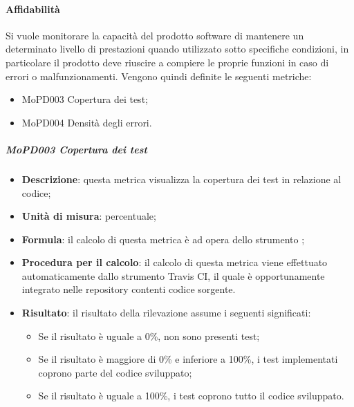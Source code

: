 \documentclass[../norme-di-progetto.tex]{subfiles}
\begin{document}
\paragraph{Affidabilità}
Si vuole monitorare la capacità del prodotto software di mantenere un determinato livello di prestazioni quando utilizzato sotto specifiche condizioni, in particolare il prodotto deve riuscire a compiere le proprie funzioni in caso di errori o malfunzionamenti. Vengono quindi definite le seguenti metriche:
\begin{itemize}
  \item MoPD003 Copertura dei test;
  \item MoPD004 Densità degli errori.
\end{itemize}
\subparagraph{MoPD003 Copertura dei test}
\begin{itemize}
  \item \textbf{Descrizione}: questa metrica visualizza la copertura dei test in relazione al codice;
  \item \textbf{Unità di misura}: percentuale;
  \item \textbf{Formula}: il calcolo di questa metrica è ad opera dello strumento ;
  \item \textbf{Procedura per il calcolo}: il calcolo di questa metrica viene effettuato automaticamente dallo strumento Travis CI, il quale è opportunamente integrato nelle repository contenti codice sorgente.
  \item \textbf{Risultato}: il risultato della rilevazione assume i seguenti significati:
  \begin{itemize}
    \item Se il risultato è uguale a 0\%, non sono presenti test;
    \item Se il risultato è maggiore di 0\% e inferiore a 100\%, i test implementati coprono parte del codice sviluppato;
    \item Se il risultato è uguale a 100\%, i test coprono tutto il codice sviluppato.
  \end{itemize}
\end{itemize}
\end{document}
